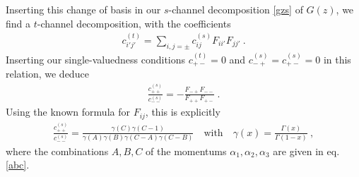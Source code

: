 \documentclass[12pt, a4paper]{article}
\theoremstyle{break}
\begin{document}
Inserting this change of basis in our $s$-channel decomposition \eqref{gzs} of $G(z)$, we find a $t$-channel decomposition, with the coefficients
\begin{align}
 c^{(t)}_{i'j'}= \sum_{i,j=\pm} c^{(s)}_{ij} F_{ii'} F_{jj'} \ .
\end{align}
Inserting our single-valuedness conditions $c^{(t)}_{+-}=0$ and $c^{(s)}_{-+}=c^{(s)}_{+-}=0$ in this relation, we deduce
\begin{align}
 \frac{c_{++}^{(s)}}{c_{--}^{(s)}} = -\frac{F_{-+}F_{--}}{F_{++}F_{+-}} \ .
\end{align}
Using the known formula for $F_{ij}$, this is explicitly
\begin{align}
 \frac{c_{++}^{(s)}} {c_{--}^{(s)}}
 = \frac{\gamma(C)\gamma(C-1)}{\gamma(A)\gamma(B)\gamma(C-A)\gamma(C-B)}\quad \text{with} \quad \gamma(x) =\frac{\Gamma(x)}{\Gamma(1-x)}\ ,
 \label{eq:coc}
\end{align}
where the combinations $A,B,C$ of the momentums $\alpha_1,\alpha_2,\alpha_3$ are given in eq. \eqref{abc}.
\end{document}
